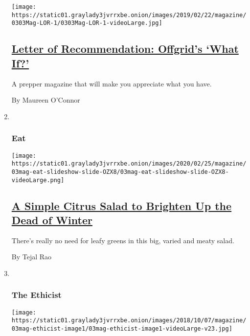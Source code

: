 \begin{enumerate}
  \texttt{[image: https://static01.graylady3jvrrxbe.onion/images/2019/02/22/magazine/0303Mag-LOR-1/0303Mag-LOR-1-videoLarge.jpg]}

  \hypertarget{letter-of-recommendation-offgrids-what-if}{%
  \subsection{\texorpdfstring{\href{/2019/02/26/magazine/letter-of-recommendation-offgrids-what-if.html}{Letter
  of Recommendation: Offgrid's `What
  If?'}}{Letter of Recommendation: Offgrid's `What If?'}}\label{letter-of-recommendation-offgrids-what-if}}

  A prepper magazine that will make you appreciate what you have.

  By Maureen O'Connor
\item ~
  \hypertarget{eat}{%
  \subsubsection{Eat}\label{eat}}

  \texttt{[image: https://static01.graylady3jvrrxbe.onion/images/2020/02/25/magazine/03mag-eat-slideshow-slide-OZX8/03mag-eat-slideshow-slide-OZX8-videoLarge.png]}

  \hypertarget{a-simple-citrus-salad-to-brighten-up-the-dead-of-winter}{%
  \subsection{\texorpdfstring{\href{/2019/02/27/magazine/citrus-salad-winter-recipe.html}{A
  Simple Citrus Salad to Brighten Up the Dead of
  Winter}}{A Simple Citrus Salad to Brighten Up the Dead of Winter}}\label{a-simple-citrus-salad-to-brighten-up-the-dead-of-winter}}

  There's really no need for leafy greens in this big, varied and meaty
  salad.

  By Tejal Rao
\item ~
  \hypertarget{the-ethicist}{%
  \subsubsection{The Ethicist}\label{the-ethicist}}

  \texttt{[image: https://static01.graylady3jvrrxbe.onion/images/2018/10/07/magazine/03mag-ethicist-image1/03mag-ethicist-image1-videoLarge-v23.jpg]}

  \hypertarget{i-think-my-former-employer-is-underpaying-a-black-employee-should-i-tell-her}{%
}
\end{enumerate}
